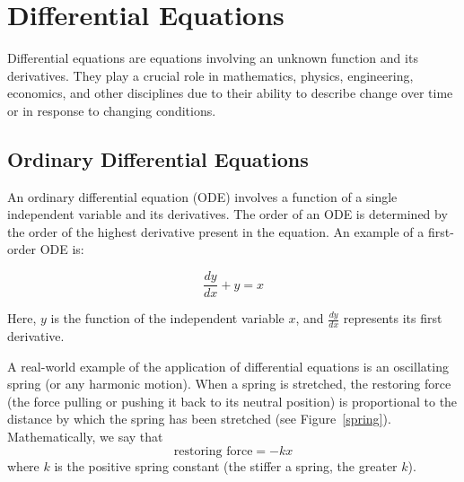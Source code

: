 \chapter{Differential Equations}

Differential equations are equations involving an unknown function and
its derivatives. They play a crucial role in mathematics, physics,
engineering, economics, and other disciplines due to their ability to
describe change over time or in response to changing conditions.

\section{Ordinary Differential Equations}

An ordinary differential equation (ODE) involves a function of a
single independent variable and its derivatives. The order of an ODE
is determined by the order of the highest derivative present in the
equation. An example of a first-order ODE is: 

\begin{equation}
\frac{dy}{dx} + y = x
\end{equation}

Here, $y$ is the function of the independent variable $x$, and 
$\frac{dy}{dx}$ represents its first derivative.

A real-world example of the application of differential equations is an 
oscillating spring (or any harmonic motion). When a spring is stretched, the 
restoring force (the force pulling or pushing it back to its neutral position) 
is proportional to the distance by which the spring has been stretched (see 
Figure~\ref{spring}). Mathematically, we say that
$$\text{restoring force} = -kx$$
where $k$ is the positive spring constant (the stiffer a spring, the greater 
$k$). 

